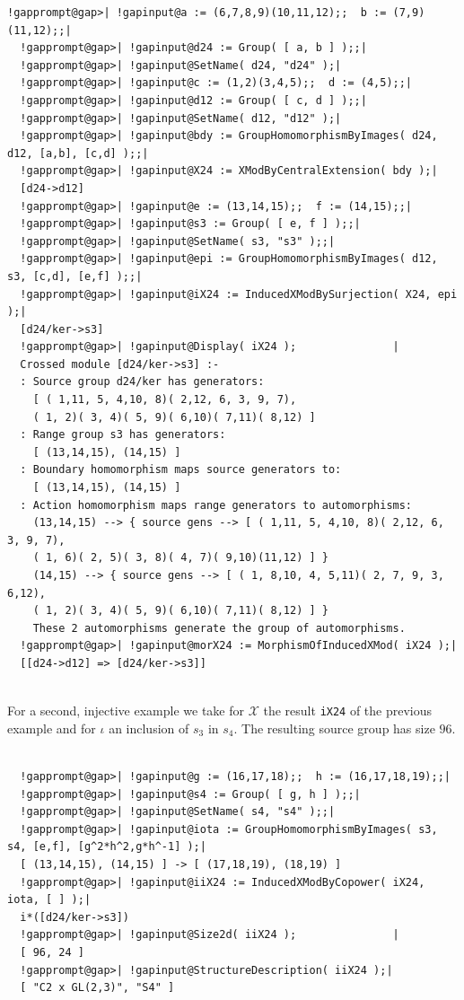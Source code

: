 \documentclass[a4paper,11pt]{report}
\newcommand{\calX}{\mathcal{X}}
\begin{document}
{{\begin{Verbatim}[commandchars=!@|,fontsize=\small,frame=single,label=Example]
  !gapprompt@gap>| !gapinput@a := (6,7,8,9)(10,11,12);;  b := (7,9)(11,12);;|
  !gapprompt@gap>| !gapinput@d24 := Group( [ a, b ] );;|
  !gapprompt@gap>| !gapinput@SetName( d24, "d24" );|
  !gapprompt@gap>| !gapinput@c := (1,2)(3,4,5);;  d := (4,5);;|
  !gapprompt@gap>| !gapinput@d12 := Group( [ c, d ] );;|
  !gapprompt@gap>| !gapinput@SetName( d12, "d12" );|
  !gapprompt@gap>| !gapinput@bdy := GroupHomomorphismByImages( d24, d12, [a,b], [c,d] );;|
  !gapprompt@gap>| !gapinput@X24 := XModByCentralExtension( bdy );|
  [d24->d12]
  !gapprompt@gap>| !gapinput@e := (13,14,15);;  f := (14,15);;|
  !gapprompt@gap>| !gapinput@s3 := Group( [ e, f ] );;|
  !gapprompt@gap>| !gapinput@SetName( s3, "s3" );;|
  !gapprompt@gap>| !gapinput@epi := GroupHomomorphismByImages( d12, s3, [c,d], [e,f] );;|
  !gapprompt@gap>| !gapinput@iX24 := InducedXModBySurjection( X24, epi );|
  [d24/ker->s3]
  !gapprompt@gap>| !gapinput@Display( iX24 );               |
  Crossed module [d24/ker->s3] :- 
  : Source group d24/ker has generators:
    [ ( 1,11, 5, 4,10, 8)( 2,12, 6, 3, 9, 7), 
    ( 1, 2)( 3, 4)( 5, 9)( 6,10)( 7,11)( 8,12) ]
  : Range group s3 has generators:
    [ (13,14,15), (14,15) ]
  : Boundary homomorphism maps source generators to:
    [ (13,14,15), (14,15) ]
  : Action homomorphism maps range generators to automorphisms:
    (13,14,15) --> { source gens --> [ ( 1,11, 5, 4,10, 8)( 2,12, 6, 3, 9, 7), 
    ( 1, 6)( 2, 5)( 3, 8)( 4, 7)( 9,10)(11,12) ] }
    (14,15) --> { source gens --> [ ( 1, 8,10, 4, 5,11)( 2, 7, 9, 3, 6,12), 
    ( 1, 2)( 3, 4)( 5, 9)( 6,10)( 7,11)( 8,12) ] }
    These 2 automorphisms generate the group of automorphisms.
  !gapprompt@gap>| !gapinput@morX24 := MorphismOfInducedXMod( iX24 );|
  [[d24->d12] => [d24/ker->s3]]
  
\end{Verbatim}
 For a second, injective example we take for $\calX$ the result \texttt{iX24} of the previous example and for $\iota$ an inclusion of $s_3$ in $s_4$. The resulting source group has size $96$. 

 
\begin{Verbatim}[commandchars=!@|,fontsize=\small,frame=single,label=Example]
  
  !gapprompt@gap>| !gapinput@g := (16,17,18);;  h := (16,17,18,19);;|
  !gapprompt@gap>| !gapinput@s4 := Group( [ g, h ] );;|
  !gapprompt@gap>| !gapinput@SetName( s4, "s4" );;|
  !gapprompt@gap>| !gapinput@iota := GroupHomomorphismByImages( s3, s4, [e,f], [g^2*h^2,g*h^-1] );|
  [ (13,14,15), (14,15) ] -> [ (17,18,19), (18,19) ]
  !gapprompt@gap>| !gapinput@iiX24 := InducedXModByCopower( iX24, iota, [ ] );|
  i*([d24/ker->s3])
  !gapprompt@gap>| !gapinput@Size2d( iiX24 );               |
  [ 96, 24 ]
  !gapprompt@gap>| !gapinput@StructureDescription( iiX24 );|
  [ "C2 x GL(2,3)", "S4" ]
  

\end{Verbatim}}}
\end{document}
